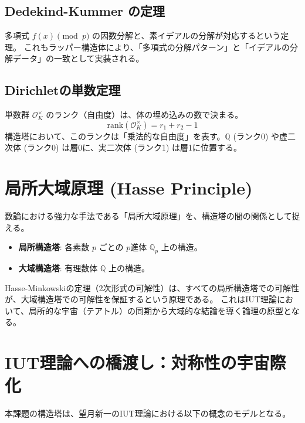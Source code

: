 \documentclass[a4paper,11pt]{ltjsarticle}
\theoremstyle{definition}
\newcommand{\Q}{\mathbb{Q}}
\newcommand{\Oint}{\mathcal{O}}
\begin{document}
\subsection{Dedekind-Kummer の定理}
多項式 $f(x) \pmod p$ の因数分解と、素イデアルの分解が対応するという定理。
これもラッパー構造体により、「多項式の分解パターン」と「イデアルの分解データ」の一致として実装される。

\subsection{Dirichletの単数定理}
単数群 $\Oint_K^\times$ のランク（自由度）は、体の埋め込みの数で決まる。
\[ \text{rank}(\Oint_K^\times) = r_1 + r_2 - 1 \]
構造塔において、このランクは「乗法的な自由度」を表す。$\Q$ (ランク0) や虚二次体 (ランク0) は層0に、実二次体 (ランク1) は層1に位置する。

\section{局所大域原理 (Hasse Principle)}

数論における強力な手法である「局所大域原理」を、構造塔の間の関係として捉える。

\begin{itemize}
    \item \textbf{局所構造塔}: 各素数 $p$ ごとの $p$進体 $\Q_p$ 上の構造。
    \item \textbf{大域構造塔}: 有理数体 $\Q$ 上の構造。
\end{itemize}

Hasse-Minkowskiの定理（2次形式の可解性）は、すべての局所構造塔での可解性が、大域構造塔での可解性を保証するという原理である。
これはIUT理論において、局所的な宇宙（テアトル）の同期から大域的な結論を導く論理の原型となる。

\section{IUT理論への橋渡し：対称性の宇宙際化}

本課題の構造塔は、望月新一のIUT理論における以下の概念のモデルとなる。
\end{document}
